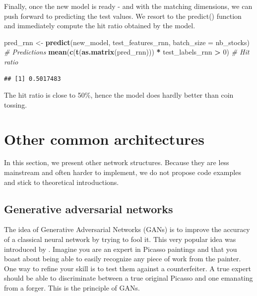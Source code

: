 \documentclass[]{krantz}
\makeatletter
\newenvironment{Shaded}{\begin{snugshade}}{\end{snugshade}}
\newcommand{\CommentTok}[1]{\textcolor[rgb]{0.37,0.37,0.37}{\textit{#1}}}
\newcommand{\DataTypeTok}[1]{\textcolor[rgb]{0.27,0.27,0.27}{#1}}
\newcommand{\DecValTok}[1]{\textcolor[rgb]{0.06,0.06,0.06}{#1}}
\newcommand{\KeywordTok}[1]{\textcolor[rgb]{0.27,0.27,0.27}{\textbf{#1}}}
\newcommand{\NormalTok}[1]{#1}
\newcommand{\OperatorTok}[1]{\textcolor[rgb]{0.43,0.43,0.43}{\textbf{#1}}}
\newcommand{\StringTok}[1]{\textcolor[rgb]{0.5,0.5,0.5}{#1}}
\newenvironment{kframe}{%
\medskip{}
\setlength{\fboxsep}{.8em}
 \def\at@end@of@kframe{}%
 \ifinner\ifhmode%
  \def\at@end@of@kframe{\end{minipage}}%
  \begin{minipage}{\columnwidth}%
 \fi\fi%
 \def\FrameCommand##1{\hskip\@totalleftmargin \hskip-\fboxsep
 \colorbox{shadecolor}{##1}\hskip-\fboxsep
     \hskip-\linewidth \hskip-\@totalleftmargin \hskip\columnwidth}%
 \MakeFramed {\advance\hsize-\width
   \@totalleftmargin\z@ \linewidth\hsize
   \@setminipage}}%
 {\par\unskip\endMakeFramed%
 \at@end@of@kframe}
\renewenvironment{Shaded}{\begin{kframe}}{\end{kframe}}
\theoremstyle{definition}
\theoremstyle{definition}
\theoremstyle{definition}
\theoremstyle{remark}
\makeatother
\begin{document}
\normalsize

Finally, once the new model is ready - and with the matching dimensions,
we can push forward to predicting the test values. We resort to the
predict() function and immediately compute the hit ratio obtained by the
model.

\footnotesize

\begin{Shaded}
\begin{Highlighting}[]
\NormalTok{pred_rnn <-}\StringTok{ }\KeywordTok{predict}\NormalTok{(new_model, test_features_rnn, }\DataTypeTok{batch_size =}\NormalTok{ nb_stocks) }\CommentTok{# Predictions}
\KeywordTok{mean}\NormalTok{(}\KeywordTok{c}\NormalTok{(}\KeywordTok{t}\NormalTok{(}\KeywordTok{as.matrix}\NormalTok{(pred_rnn))) }\OperatorTok{*}\StringTok{ }\NormalTok{test_labels_rnn }\OperatorTok{>}\StringTok{ }\DecValTok{0}\NormalTok{)           }\CommentTok{# Hit ratio}
\end{Highlighting}
\end{Shaded}

\begin{verbatim}
## [1] 0.5017483
\end{verbatim}

\normalsize

The hit ratio is close to 50\%, hence the model does hardly better than
coin tossing.

\hypertarget{other-common-architectures}{%
\section{Other common architectures}\label{other-common-architectures}}

In this section, we present other network structures. Because they are
less mainstream and often harder to implement, we do not propose code
examples and stick to theoretical introductions.

\hypertarget{generative-aversarial-networks}{%
\subsection{Generative adversarial
networks}\label{generative-aversarial-networks}}

The idea of Generative Adversarial Networks (GANs) is to improve the
accuracy of a classical neural network by trying to fool it. This very
popular idea was introduced by \citet{goodfellow2014generative}. Imagine
you are an expert in Picasso paintings and that you boast about being
able to easily recognize any piece of work from the painter. One way to
refine your skill is to test them against a counterfeiter. A true expert
should be able to discriminate between a true original Picasso and one
emanating from a forger. This is the principle of GANs.
\end{document}
